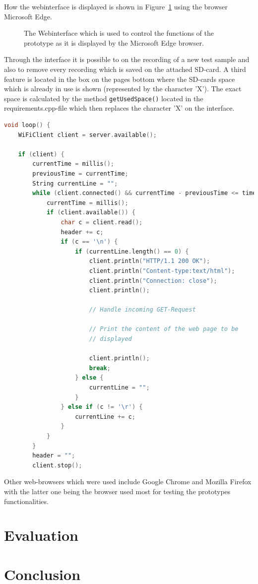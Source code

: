 How the webinterface is displayed is shown in Figure~\ref{fig:webinterface} using the browser Microsoft Edge.
\begin{figure}
	\caption{The Webinterface which is used to control the functions of the prototype as it is displayed by the Microsoft Edge browser.}
	\label{fig:webinterface}
\end{figure}
Through the interface it is possible to on the recording of a new test sample and also to remove every recording which is saved on the attached SD-card.
A third feature is located in the box on the pages bottom where the SD-cards space which is already in use is shown (represented by the character 'X').
The exact space is calculated by the method \texttt{getUsedSpace()} located in the requirements.cpp-file which then replaces the character 'X' on the interface. 
\begin{lstlisting}[frame=single, language={c++}, style=style,
	caption={The part of the loop-function which is used to manage the connection of a socket hosted on the microcontroller to a web-client.}, label={lst:WiFiCon},float=!htb]
void loop() {
	WiFiClient client = server.available();
	
	if (client) {
		currentTime = millis();
		previousTime = currentTime;
		String currentLine = "";
		while (client.connected() && currentTime - previousTime <= timeoutTime) {
			currentTime = millis();
			if (client.available()) {
				char c = client.read();
				header += c;
				if (c == '\n') {
					if (currentLine.length() == 0) {
						client.println("HTTP/1.1 200 OK");
						client.println("Content-type:text/html");
						client.println("Connection: close");
						client.println();
						
						// Handle incoming GET-Request
						
						// Print the content of the web page to be
						// displayed
						
						client.println();
						break;
					} else {
						currentLine = "";
					}
				} else if (c != '\r') {
					currentLine += c;
				}
			}
		}
		header = "";
		client.stop();
\end{lstlisting}

Other web-browsers which were used include Google Chrome and Mozilla Firefox with the latter one being the browser used most for testing the prototypes functionalities.

\section{Evaluation}
\section{Conclusion}
